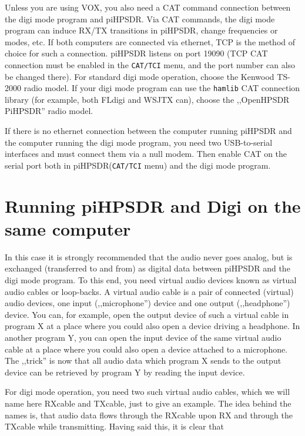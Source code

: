 \documentclass[12pt]{book}
\def\bltt#1{\texttt{\color{blue}#1}}
\def\pH{pi\-HPSDR\xspace}
\begin{document}
Unless you are using VOX, you also need a CAT command connection between the digi mode program
and \pH. Via CAT commands, the digi mode program can induce RX/TX transitions in \pH,
change frequencies or modes, etc. If both computers are connected via ethernet,
TCP is the method of choice for such a connection. \pH listens on port 19090 (TCP CAT
connection must be enabled in the \bltt{CAT/TCI} menu, and the port number can also
be changed there). For standard digi mode operation, choose the
Kenwood TS-2000 radio model. If your digi mode program can use the \texttt{hamlib} CAT connection
library (for example, both FLdigi and WSJTX can), choose the ,,OpenHPSDR PiHPSDR'' radio
model.

If there is no ethernet connection between the computer running \pH and the computer
running the digi mode program, you need two USB-to-serial interfaces and must connect them
via a null modem. Then enable CAT on the serial port both in \pH (\bltt{CAT/TCI} menu) and the
digi mode program.

\section[\pH and Digi on same computer]{Running \pH and Digi on the same computer}
In this case it is strongly recommended that the audio never goes analog, but is
exchanged (transferred to and from)
as digital data between \pH and the digi mode program. To this end, you need
virtual audio devices known as {\color{red} virtual audio cables} or {\color{red}
loop-backs}. A virtual audio cable is a pair of connected (virtual) audio devices,
one input (,,microphone'') device and one output (,,headphone'') device. You can,
for example, open the output device of such a virtual cable in program X at a place
where you could also open a device driving a headphone. In another program Y, you can
open the input device of the same virtual audio cable at a place where you could also
open a device attached to a microphone. The ,,trick'' is now that all audio data which
program X sends to the output device can be retrieved by program Y by reading the input device.



For digi mode operation, you need two such virtual audio cables, which we will name here
RXcable and TXcable, just to give an example. The idea behind the names is, that audio data
flows through the RXcable upon RX and through the TXcable while transmitting. Having said this,
it is clear that
\end{document}
